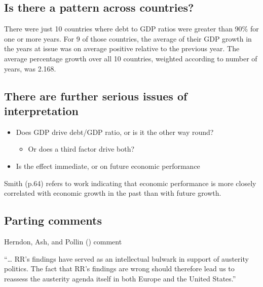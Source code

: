 \documentclass[
  10ptls,
  b5paper]{book}
\providecommand{\tightlist}{%
  \setlength{\itemsep}{0pt}\setlength{\parskip}{0pt}}
\begin{document}
\subsection*{Is there a pattern across countries?}\label{is-there-a-pattern-across-countries}

There were just 10 countries where debt to GDP ratios were greater than 90\% for one or more years. For 9 of those countries, the average of their GDP growth in the years at issue was on average positive relative to the previous year. The average percentage growth over all 10 countries, weighted according to number of years, was 2.168.

\subsection*{There are further serious issues of interpretation}\label{there-are-further-serious-issues-of-interpretation}

\begin{itemize}
\tightlist
\item
  Does GDP drive debt/GDP ratio, or is it the other way round?

  \begin{itemize}
  \tightlist
  \item
    Or does a third factor drive both?
  \end{itemize}
\item
  Is the effect immediate, or on future economic performance
\end{itemize}

Smith (p.64) refers to work indicating that economic performance is more closely correlated with economic growth in the past than with future growth.

\subsection*{Parting comments}\label{parting-comments}

Herndon, Ash, and Pollin () comment

``\ldots{} RR's findings have served as an intellectual bulwark in support of austerity politics. The fact that RR's findings are wrong should therefore lead us to reassess the austerity agenda itself in both Europe and the United States.''
\end{document}
